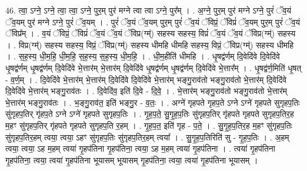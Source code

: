 \documentclass[17pt]{extarticle}
\begin{document}
46. त्वा॒ ऽग्ने॒ ऽग्ने॒ त्वा॒ त्वा॒ ऽग्ने॒ पुर॒म् पुर॑ मग्ने त्वा त्वा ऽग्ने॒ पुर᳚म् । . अ॒ग्ने॒ पुर॒म् पुर॑ मग्ने ऽग्ने॒ पुरं॑ ॅव॒यं ॅव॒यम् पुर॑ मग्ने ऽग्ने॒ पुरं॑ ॅव॒यम् । . पुरं॑ ॅव॒यं ॅव॒यम् पुर॒म् पुरं॑ ॅव॒यं ॅविप्रं॒ ॅविप्रं॑ ॅव॒यम् पुर॒म् पुरं॑ ॅव॒यं ॅविप्र᳚म् । . व॒यं ॅविप्रं॒ ॅविप्रं॑ ॅव॒यं ॅव॒यं ॅविप्र(ग्म्॑) सहस्य सहस्य॒ विप्रं॑ ॅव॒यं ॅव॒यं ॅविप्र(ग्म्॑) सहस्य । . विप्र(ग्म्॑) सहस्य सहस्य॒ विप्रं॒ ॅविप्र(ग्म्॑) सहस्य धीमहि धीमहि सहस्य॒ विप्रं॒ ॅविप्र(ग्म्॑) सहस्य धीमहि । . स॒ह॒स्य॒ धी॒म॒हि॒ धी॒म॒हि॒ स॒ह॒स्य॒ स॒ह॒स्य॒ धी॒म॒हि॒ । . धी॒म॒हीति॑ धीमहि । . धृ॒षद्व॑र्णम् दि॒वेदि॑वे दि॒वेदि॑वे धृ॒षद्व॑र्णम् धृ॒षद्व॑र्णम् दि॒वेदि॑वे भे॒त्तार॑म् भे॒त्तार॑म् दि॒वेदि॑वे धृ॒षद्व॑र्णम् धृ॒षद्व॑र्णम् दि॒वेदि॑वे भे॒त्तार᳚म् । . धृ॒षद्व॑र्ण॒मिति॑ धृ॒षत् - व॒र्ण॒म् । . दि॒वेदि॑वे भे॒त्तार॑म् भे॒त्तार॑म् दि॒वेदि॑वे दि॒वेदि॑वे भे॒त्तार॑म् भङ्गु॒राव॑तो भङ्गु॒राव॑तो भे॒त्तार॑म् दि॒वेदि॑वे दि॒वेदि॑वे भे॒त्तार॑म् भङ्गु॒राव॑तः । . दि॒वेदि॑व॒ इति॑ दि॒वे - दि॒वे॒ । . भे॒त्तार॑म् भङ्गु॒राव॑तो भङ्गु॒राव॑तो भे॒त्तार॑म् भे॒त्तार॑म् भङ्गु॒राव॑तः । . भ॒ङ्गु॒राव॑त॒ इति॑ भङ्गु॒र - व॒तः॒ । . अग्ने॑ गृहपते गृहप॒ते ऽग्ने ऽग्ने॑ गृहपते सुगृहप॒तिः सु॑गृहप॒तिर् गृ॑हप॒ते ऽग्ने ऽग्ने॑ गृहपते सुगृहप॒तिः । . गृ॒ह॒प॒ते॒ सु॒गृ॒ह॒प॒तिः सु॑गृहप॒तिर् गृ॑हपते गृहपते सुगृहप॒तिर॒ह म॒हꣳ सु॑गृहप॒तिर् गृ॑हपते गृहपते सुगृहप॒ति र॒हम् । . गृ॒ह॒प॒त॒ इति॑ गृह - प॒ते॒ । . सु॒गृ॒ह॒प॒तिर॒ह म॒हꣳ सु॑गृहप॒तिः सु॑गृहप॒तिर॒हम् त्वया॒ त्वया॒ ऽहꣳ सु॑गृहप॒तिः सु॑गृहप॒तिर॒हम् त्वया᳚ । . सु॒गृ॒ह॒प॒तिरिति॑ सु - गृ॒ह॒प॒तिः । . अ॒हम् त्वया॒ त्वया॒ ऽह म॒हम् त्वया॑ गृ॒हप॑तिना गृ॒हप॑तिना॒ त्वया॒ ऽह म॒हम् त्वया॑ गृ॒हप॑तिना । . त्वया॑ गृ॒हप॑तिना गृ॒हप॑तिना॒ त्वया॒ त्वया॑ गृ॒हप॑तिना भूयासम् भूयासम् गृ॒हप॑तिना॒ त्वया॒ त्वया॑ गृ॒हप॑तिना भूयासम् । \newline
\end{document}

